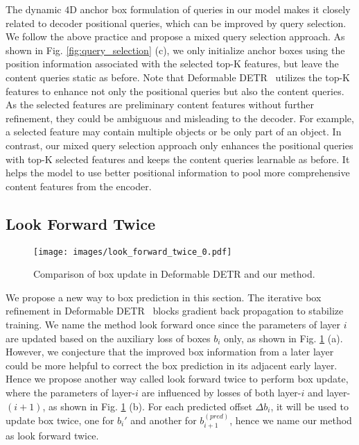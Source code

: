 \documentclass[runningheads]{llncs}
\begin{document}
The dynamic $4$D anchor box formulation of queries in our model makes it closely related to decoder positional queries, which can be improved by query selection. We follow the above practice and propose a mixed query selection approach. As shown in Fig. \ref{fig:query_selection} (c), we only initialize anchor boxes using the position information associated with the selected top-K features, but leave the content queries static as before.
Note that Deformable DETR~\cite{zhu2020deformable} utilizes the top-K features to enhance not only the positional queries but also the content queries. As the selected features are preliminary content features without further refinement, they could be ambiguous and misleading to the decoder. For example, a selected feature may contain multiple objects or be only part of an object. In contrast, our mixed query selection approach only enhances the positional queries with top-K selected features and keeps the content queries learnable as before. It helps the model to use better positional information to pool more comprehensive content features from the encoder.




\vspace{-0.2cm}
\subsection{Look Forward Twice}
\label{sec:look_forward}
\begin{figure}[h]
\texttt{[image: images/look\_forward\_twice\_0.pdf]}
    \centering
\caption{Comparison of box update in Deformable DETR and our method.}
    \label{fig:look_forward}
\end{figure} 
We propose a new way to box prediction in this section. The iterative box refinement in Deformable DETR~\cite{zhu2020deformable} blocks gradient back propagation to stabilize training. We name the method look forward once since the parameters of layer $i$ are updated based on the auxiliary loss of boxes $b_i$ only, as shown in Fig. \ref{fig:look_forward} (a). 
However, we conjecture that the improved box information from a later layer could be more helpful to correct the box prediction in its adjacent early layer. Hence we propose another way called look forward twice to perform box update, where the parameters of layer-$i$ are influenced by losses of both layer-$i$ and layer-$(i+1)$, as shown in Fig. \ref{fig:look_forward} (b). For each predicted offset $\Delta b_i$, it will be used to update box twice, one for $b_i'$ and another for $b_{i+1}^{(pred)}$, hence we name our method as look forward twice.
\end{document}
